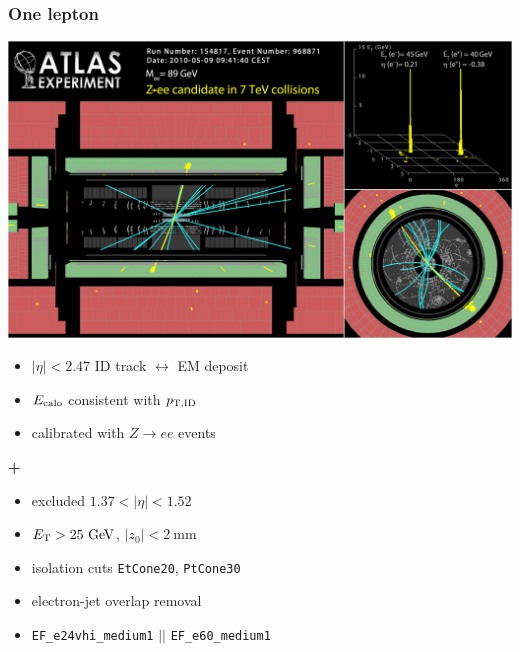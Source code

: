\begin{frame}\frametitle{One lepton}
\footnotesize\centering\myskip

\begin{minipage}{.5\textwidth}\centering
\includegraphics[width=.9\textwidth,height=0.3\textheight]{pics/Zee}

\begin{itemize}
\item $|\eta|<2.47$ ID track $\leftrightarrow$ EM deposit
\item $E_{\rm calo}$ consistent with $p_{\rm T, ID}$
\item calibrated with $Z\to ee$ events
\end{itemize}
{\cccolor \bfseries +}\\
\begin{itemize}
\item excluded $1.37< |\eta|< 1.52$
\item $\et > 25\gev$, $|z_0|<2~$mm
\item isolation cuts {\scriptsize\texttt{EtCone20}, \texttt{PtCone30}}
\item electron-jet overlap removal
\item {\scriptsize\texttt{EF\_e24vhi\_medium1} $||$ \texttt{EF\_e60\_medium1}}
\end{itemize}


\end{minipage}\begin{minipage}{.5\textwidth}\centering



\end{minipage}
\end{frame}
